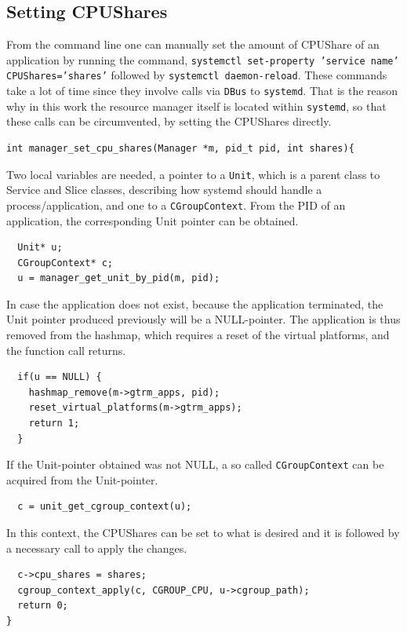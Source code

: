 \documentclass[nobiblatex]{LTHthesis}
\begin{document}
\subsection{Setting CPUShares}
From the command line one can manually set the amount of CPUShare of 
an application by running the command, 
\texttt{systemctl set-property 'service name' CPUShares='shares'} followed 
by \texttt{systemctl daemon-reload}. These commands take a lot of time since
they involve calls via \texttt{DBus} to \texttt{systemd}. That is the reason
why in this work the resource manager itself is located within 
\texttt{systemd}, so that these calls can be circumvented, by setting 
the CPUShares directly.

\begin{lstlisting}
int manager_set_cpu_shares(Manager *m, pid_t pid, int shares){
\end{lstlisting}
Two local variables are needed, a pointer to a \texttt{Unit}, which is a parent class to Service and Slice classes, describing how systemd should handle a process/application, and one to a 
\texttt{CGroupContext}. From the PID of an application, the corresponding 
Unit pointer can be obtained.
\begin{lstlisting}
  Unit* u;
  CGroupContext* c;
  u = manager_get_unit_by_pid(m, pid);
\end{lstlisting}
In case the application does not exist, because the application terminated,
the Unit pointer produced previously will be a NULL-pointer. The application
is thus removed from the hashmap, which requires a reset of the virtual
platforms, and the function call returns.
\begin{lstlisting}
  if(u == NULL) {
    hashmap_remove(m->gtrm_apps, pid);
    reset_virtual_platforms(m->gtrm_apps);
    return 1;
  }
\end{lstlisting}

If the Unit-pointer obtained was not NULL, a so called \texttt{CGroupContext}
can be acquired from the Unit-pointer.
\begin{lstlisting}
  c = unit_get_cgroup_context(u);
\end{lstlisting}
In this context, the CPUShares can be set to what is desired and it is
followed by a necessary call to apply the changes.
\begin{lstlisting}
  c->cpu_shares = shares;
  cgroup_context_apply(c, CGROUP_CPU, u->cgroup_path);
  return 0;
}
\end{lstlisting}
\end{document}
